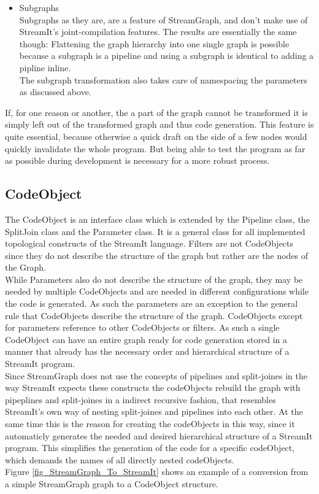 \documentclass[journal]{IEEEtran}
\begin{document}
\begin{itemize}
\item Subgraphs\\
  Subgraphs as they are, are a feature of StreamGraph, and don't make use of
  StreamIt's joint-compilation features. The results are essentially the same
  though: Flattening the graph hierarchy into one single graph is possible
  because a subgraph is a pipeline and using a subgraph is identical to adding
  a pipline inline.\\
  The subgraph transformation also takes care of namespacing the parameters as
  discussed above.\\

\end{itemize}

If, for one reason or another, the a part of the graph cannot be transformed
it is simply left out of the transformed graph and thus code generation. This
feature is quite essential, because otherwise a quick draft on the side of a
few nodes would quickly invalidate the whole program. But being able to test
the program as far as possible during development is necessary for a more
robust process.


\subsection{CodeObject}
\noindent The CodeObject is an interface class which is extended by the Pipeline
class, the SplitJoin class and the Parameter class. It is a general class for
all implemented topological constructs of the StreamIt language. Filters are not
CodeObjects since they do not describe the structure of the graph but rather are
the nodes of the Graph.\\
While Parameters also do not describe the structure of the graph, they may be
needed by multiple CodeObjects and are needed in different configurations while
the code is generated. As such the parameters are an exception to the general
rule that CodeObjects describe the structure of the graph. CodeObjects except
for parameters reference to other CodeObjects or filters. As such a single
CodeObject can have an entire graph ready for code generation stored in a manner
that already has the necessary order and hierarchical structure of a StreamIt
program.\\
Since StreamGraph does not use the concepts of pipelines and split-joines in 
the way StreamIt expects these constructs the codeObjects rebuild the graph 
with pipeplines and split-joines in a indirect recursive fashion, that 
resembles StreamIt's own way of nesting split-joines and pipelines into 
each other. At the same time this is the reason for creating the 
codeObjects in this way, since it automaticly generates the needed 
and desired hierarchical structure of a StreamIt program. This 
simplifies the generation of the code for a specific codeObject, 
which demands the names of all directly nested codeObjects.\\
Figure \ref{fig_StreamGraph_To_StreamIt} shows an example of a 
conversion from a simple StreamGraph graph to a CodeObject structure.\\
\end{document}
